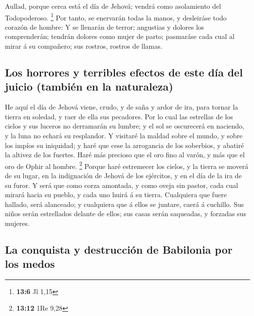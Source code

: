  Aullad, porque cerca está el día de Jehová; vendrá como
asolamiento del Todopoderoso. \footnote{\textbf{13:6} Jl 1,15}
 Por tanto, se enervarán todas la manos, y desleiráse todo
corazón de hombre:  Y se llenarán de terror; angustias y
dolores los comprenderán; tendrán dolores como mujer de parto; pasmaráse
cada cual al mirar á su compañero; sus rostros, rostros de llamas.

\hypertarget{los-horrores-y-terribles-efectos-de-este-duxeda-del-juicio-tambiuxe9n-en-la-naturaleza}{%
\subsection{Los horrores y terribles efectos de este día del juicio
(también en la
naturaleza)}\label{los-horrores-y-terribles-efectos-de-este-duxeda-del-juicio-tambiuxe9n-en-la-naturaleza}}

 He aquí el día de Jehová viene, crudo, y de saña y ardor de
ira, para tornar la tierra en soledad, y raer de ella sus pecadores.
 Por lo cual las estrellas de los cielos y sus luceros no
derramarán su lumbre; y el sol se oscurecerá en naciendo, y la luna no
echará su resplandor.  Y visitaré la maldad sobre el mundo,
y sobre los impíos su iniquidad; y haré que cese la arrogancia de los
soberbios, y abatiré la altivez de los fuertes.  Haré más
precioso que el oro fino al varón, y más que el oro de Ophir al hombre.
\footnote{\textbf{13:12} 1Re 9,28}  Porque haré estremecer
los cielos, y la tierra se moverá de su lugar, en la indignación de
Jehová de los ejércitos, y en el día de la ira de su furor.
 Y será que como corza amontada, y como oveja sin pastor,
cada cual mirará hacia su pueblo, y cada uno huirá á su tierra.
 Cualquiera que fuere hallado, será alanceado; y cualquiera
que á ellos se juntare, caerá á cuchillo.  Sus niños serán
estrellados delante de ellos; sus casas serán saqueadas, y forzadas sus
mujeres.

\hypertarget{la-conquista-y-destrucciuxf3n-de-babilonia-por-los-medos}{%
\subsection{La conquista y destrucción de Babilonia por los
medos}\label{la-conquista-y-destrucciuxf3n-de-babilonia-por-los-medos}}

